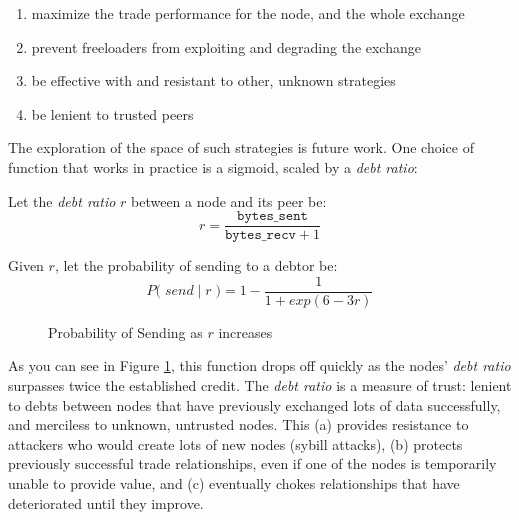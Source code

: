 \documentclass{sig-alternate}
\begin{document}
\begin{enumerate}
  \item maximize the trade performance for the node, and the whole exchange
  \item prevent freeloaders from exploiting and degrading the exchange
  \item be effective with and resistant to other, unknown
  strategies
  \item be lenient to trusted peers
\end{enumerate}

The exploration of the space of such strategies is future work.
One choice of function that works in practice is a sigmoid, scaled by a
\textit{debt ratio}:

Let the \textit{debt ratio} $ r $ between a node and its peer be:
  \[ r = \dfrac{\texttt{bytes\_sent}}{\texttt{bytes\_recv} + 1} \]

Given $r$, let the probability of sending to a debtor be:
  \[ P\Big( \; send \; | \; r \;\Big) = 1 - \dfrac{1}{1 + exp(6-3r)} \]

\begin{figure}
\centering
{}
\caption{Probability of Sending as $r$ increases}
\label{fig:psending-graph}
\end{figure}

As you can see in Figure \ref{fig:psending-graph}, this function drops off quickly as the nodes'
\textit{debt ratio} surpasses twice the established credit.
The \textit{debt ratio} is a measure of trust:
lenient to debts between nodes that have previously exchanged lots of data
successfully, and merciless to unknown, untrusted nodes. This
(a) provides resistance to attackers who would create lots of new nodes
(sybill attacks),
(b) protects previously successful trade relationships, even if one of the
nodes is temporarily unable to provide value, and
(c) eventually chokes relationships that have deteriorated until they
improve.
\end{document}
